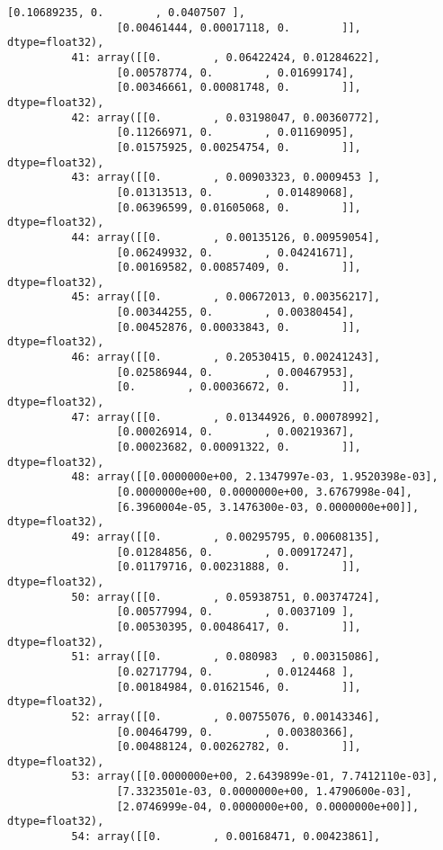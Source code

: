 \documentclass[11pt]{article}
\begin{document}
\begin{Verbatim}[commandchars=\\\{\}]
                 [0.10689235, 0.        , 0.0407507 ],
                 [0.00461444, 0.00017118, 0.        ]], dtype=float32),
          41: array([[0.        , 0.06422424, 0.01284622],
                 [0.00578774, 0.        , 0.01699174],
                 [0.00346661, 0.00081748, 0.        ]], dtype=float32),
          42: array([[0.        , 0.03198047, 0.00360772],
                 [0.11266971, 0.        , 0.01169095],
                 [0.01575925, 0.00254754, 0.        ]], dtype=float32),
          43: array([[0.        , 0.00903323, 0.0009453 ],
                 [0.01313513, 0.        , 0.01489068],
                 [0.06396599, 0.01605068, 0.        ]], dtype=float32),
          44: array([[0.        , 0.00135126, 0.00959054],
                 [0.06249932, 0.        , 0.04241671],
                 [0.00169582, 0.00857409, 0.        ]], dtype=float32),
          45: array([[0.        , 0.00672013, 0.00356217],
                 [0.00344255, 0.        , 0.00380454],
                 [0.00452876, 0.00033843, 0.        ]], dtype=float32),
          46: array([[0.        , 0.20530415, 0.00241243],
                 [0.02586944, 0.        , 0.00467953],
                 [0.        , 0.00036672, 0.        ]], dtype=float32),
          47: array([[0.        , 0.01344926, 0.00078992],
                 [0.00026914, 0.        , 0.00219367],
                 [0.00023682, 0.00091322, 0.        ]], dtype=float32),
          48: array([[0.0000000e+00, 2.1347997e-03, 1.9520398e-03],
                 [0.0000000e+00, 0.0000000e+00, 3.6767998e-04],
                 [6.3960004e-05, 3.1476300e-03, 0.0000000e+00]], dtype=float32),
          49: array([[0.        , 0.00295795, 0.00608135],
                 [0.01284856, 0.        , 0.00917247],
                 [0.01179716, 0.00231888, 0.        ]], dtype=float32),
          50: array([[0.        , 0.05938751, 0.00374724],
                 [0.00577994, 0.        , 0.0037109 ],
                 [0.00530395, 0.00486417, 0.        ]], dtype=float32),
          51: array([[0.        , 0.080983  , 0.00315086],
                 [0.02717794, 0.        , 0.0124468 ],
                 [0.00184984, 0.01621546, 0.        ]], dtype=float32),
          52: array([[0.        , 0.00755076, 0.00143346],
                 [0.00464799, 0.        , 0.00380366],
                 [0.00488124, 0.00262782, 0.        ]], dtype=float32),
          53: array([[0.0000000e+00, 2.6439899e-01, 7.7412110e-03],
                 [7.3323501e-03, 0.0000000e+00, 1.4790600e-03],
                 [2.0746999e-04, 0.0000000e+00, 0.0000000e+00]], dtype=float32),
          54: array([[0.        , 0.00168471, 0.00423861],

\end{Verbatim}
\end{document}
